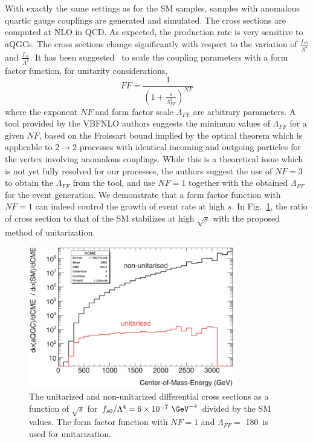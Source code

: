 
With exactly the same settings as for the SM samples, samples with
anomalous quartic gauge couplings are generated and simulated.  The
cross sections are computed at NLO in QCD. As expected, the production
rate is very sensitive to aQGCs. The cross sections change
significantly with respect to the variation of
$\frac{f_{s0}}{\Lambda^4}$ and $\frac{f_{s1}}{\Lambda^4}$. It has been
suggested~\cite{aQGC:Twiki} to scale the coupling parameters with a form factor
function, for unitarity considerations,
\[
FF = \frac{1}{\left(1 + \frac{s}{\Lambda_{FF}^2}\right)^{NF}}
\]
where the exponent $NF$ and form factor scale $\Lambda_{FF}$ are
arbitrary parameters.  A tool provided by the {\sc
  VBFNLO} authors suggests the minimum values of $\Lambda_{FF}$
for a given $NF$, based on the Froissart bound implied by the optical
theorem which is applicable to $2\rightarrow 2$ processes with
identical incoming and outgoing particles for the vertex involving
anomalous couplings.  While this is a theoretical issue which is not
yet fully resolved for our processes, the authors suggest the use of $NF =
3$ to obtain the $\Lambda_{FF}$ from the tool, and use $NF = 1$
together with the obtained $\Lambda_{FF}$ for the event generation.
We demonstrate that a form factor function with $NF=1$ can indeed
control the growth of event rate at high $s$. In
Fig.~\ref{fig:unitaritycheck}, the ratio of cross section to that of
the SM stabilizes at high $\sqrt{s}$ with the proposed method of
unitarization.
\begin{figure}[htp]
  \centering
  \includegraphics[width=0.8\textwidth]{figures/signal_section/Unitarity_check.eps}  
  \caption{The unitarized and non-unitarized differential cross
    sections as a function of $\sqrt{s}$ for $f_{s0}/\Lambda^4
    = 6\times 10^{-7}~\GeV^{-4}$ divided by the SM values. The
    form factor function with $NF=1$ and $\Lambda_{FF} =$ 180~\GeV is
    used for unitarization.  }
\label{fig:unitaritycheck}
\end{figure}
